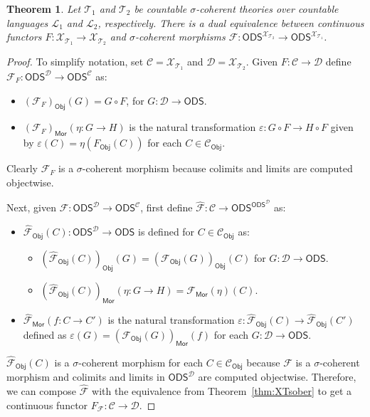 \documentclass[10pt,a4paper]{amsart}
\newtheorem{theorem}{Theorem}
\newcommand{\Mor}{\mathsf{Mor}}
\newcommand{\ODS}{{\mathsf{ODS}}}
\newcommand{\Obj}{\mathsf{Obj}}
\def\cal#1{{\mathcal #1}}
\def\calC{{\cal C}}
\def\calD{{\cal D}}
\def\calF{{\cal F}}
\def\calL{{\cal L}}
\def\calT{{\cal T}}
\def\calX{{\cal X}}
\begin{document}
\begin{theorem}
Let $\calT_1$ and $\calT_2$ be countable $\sigma$-coherent theories over countable languages $\calL_1$ and $\calL_2$, respectively. There is a dual equivalence between continuous functors $F\colon \calX_{\calT_1} \to \calX_{\calT_2}$ and $\sigma$-coherent morphisms $\calF\colon \ODS^{\calX_{\calT_2}} \to \ODS^{\calX_{\calT_1}}$.
\end{theorem}

\begin{proof}
To simplify notation, set $\calC=\calX_{\calT_1}$ and $\calD=\calX_{\calT_2}$. Given $F\colon \calC\to\calD$ define $\calF_F\colon \ODS^\calD \to \ODS^\calC$ as:
\begin{itemize}
\item
$(\calF_F)_\Obj(G) = G\circ F$, for $G\colon \calD\to\ODS$.
\item
$(\calF_F)_\Mor(\eta\colon G\to H)$ is the natural transformation $\varepsilon \colon G\circ F \to H\circ F$ given by $\varepsilon(C)=\eta(F_\Obj(C))$ for each $C\in\calC_\Obj$.
\end{itemize}
Clearly $\calF_F$ is a $\sigma$-coherent morphism because colimits and limits are computed objectwise.

Next, given $\calF\colon \ODS^\calD \to \ODS^\calC$, first define $\widehat{\calF}\colon \calC\to \ODS^{\ODS^\calD}$ as:
\begin{itemize}
\item
$\widehat{\calF}_\Obj(C)\colon \ODS^{\calD}\to\ODS$ is defined for $C\in\calC_\Obj$ as:
\begin{itemize}
\item
$(\widehat{\calF}_\Obj(C))_\Obj(G) = (\calF_\Obj(G))_\Obj(C)$ for $G\colon \calD\to\ODS$.
\item
$(\widehat{\calF}_\Obj(C))_\Mor(\eta\colon G\to H) = \calF_\Mor(\eta)(C)$.
\end{itemize}
\item
$\widehat{\calF}_\Mor(f\colon C\to C')$ is the natural transformation $\varepsilon\colon \widehat{\calF}_\Obj(C)\to \widehat{\calF}_\Obj(C')$ defined as $\varepsilon(G) = (\calF_\Obj(G))_\Mor(f)$ for each $G\colon \calD\to\ODS$.
\end{itemize}
$\widehat{\calF}_\Obj(C)$ is a $\sigma$-coherent morphism for each $C\in\calC_\Obj$ because $\calF$ is a $\sigma$-coherent morphism and colimits and limits in $\ODS^\calD$ are computed objectwise. Therefore, we can compose $\widehat{\calF}$ with the equivalence from Theorem~\ref{thm:XTsober} to get a continuous functor $F_\calF\colon\calC\to\calD$.


\end{proof}
\end{document}
